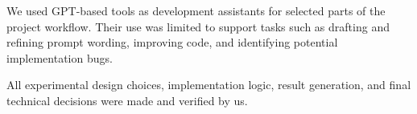 We used GPT-based tools as development assistants for selected parts of the project workflow. Their use was limited to support tasks such as drafting and refining prompt wording, improving code, and identifying potential implementation bugs.

All experimental design choices, implementation logic, result generation, and final technical decisions were made and verified by us.